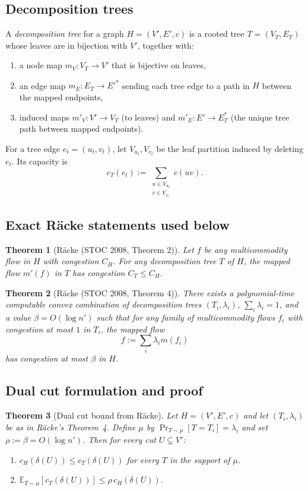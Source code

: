 \documentclass[11pt]{article}
\newtheorem{theorem}{Theorem}
\newcommand{\cut}{\delta}
\newcommand{\Etree}{\mathbb{E}_{T\sim\mu}}
\begin{document}
\subsection{Decomposition trees}

A \emph{decomposition tree} for a graph $H=(V',E',c)$ is a rooted tree
$T=(V_T,E_T)$ whose leaves are in bijection with $V'$, together with:
\begin{enumerate}
  \item a node map $m_V:V_T\to V'$ that is bijective on leaves,
  \item an edge map $m_E:E_T\to E'^*$ sending each tree edge to a path in $H$
  between the mapped endpoints,
  \item induced maps $m'_V:V'\to V_T$ (to leaves) and $m'_E:E'\to E_T^*$
  (the unique tree path between mapped endpoints).
\end{enumerate}
For a tree edge $e_t=(u_t,v_t)$, let $V_{u_t},V_{v_t}$ be the leaf partition
induced by deleting $e_t$. Its capacity is
\[
  c_T(e_t):=\sum_{\substack{u\in V_{u_t}\\ v\in V_{v_t}}} c(uv).
\]

\subsection{Exact Räcke statements used below}

\begin{theorem}[Räcke (STOC 2008, Theorem 2)]
Let $f$ be any multicommodity flow in $H$ with congestion $C_H$.
For any decomposition tree $T$ of $H$, the mapped flow $m'(f)$ in $T$
has congestion $C_T\le C_H$.
\end{theorem}

\begin{theorem}[Räcke (STOC 2008, Theorem 4)]
There exists a polynomial-time computable convex combination of decomposition
trees $(T_i,\lambda_i)$, $\sum_i\lambda_i=1$, and a value
$\beta=O(\log n')$ such that for any family of multicommodity flows
$f_i$ with congestion at most $1$ in $T_i$, the mapped flow
\[
  f:=\sum_i \lambda_i m(f_i)
\]
has congestion at most $\beta$ in $H$.
\end{theorem}

\subsection{Dual cut formulation and proof}

\begin{theorem}[Dual cut bound from Räcke]\label{thm:racke}
Let $H=(V',E',c)$ and let $(T_i,\lambda_i)$ be as in Räcke's Theorem~4.
Define $\mu$ by $\Pr_{T\sim\mu}[T=T_i]=\lambda_i$ and set
$\rho:=\beta=O(\log n')$. Then for every cut $U\subsetneq V'$:
\begin{enumerate}
  \item[(i)] $c_H(\cut(U))\le c_T(\cut(U))$ for every $T$ in the support of $\mu$.
  \item[(ii)] $\Etree[c_T(\cut(U))]\le \rho\,c_H(\cut(U))$.
\end{enumerate}
\end{theorem}
\end{document}
